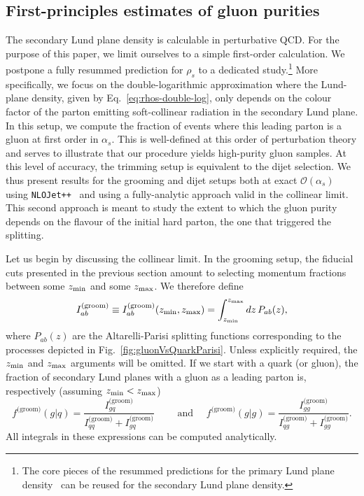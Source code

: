 \documentclass[a4paper,11pt]{article}
\newcommand{\zmin}{z_{\rm{min}}}
\newcommand{\zmax}{z_{\rm{max}}}
\begin{document}
\subsection{First-principles estimates of gluon purities}
\label{sec:analytics}
The secondary Lund plane density is calculable in perturbative QCD. For the purpose of this paper, we limit ourselves to a simple first-order calculation. We postpone a fully resummed prediction for $\rho_s$ to a dedicated study.\footnote{The core pieces of the resummed predictions for the primary Lund plane density~\cite{Lifson:2020gua} can be reused for the secondary Lund plane density.} 
%
More specifically, we focus on the double-logarithmic approximation where the Lund-plane density, given by Eq.~\eqref{eq:rhos-double-log}, only depends on the colour factor of the parton emitting soft-collinear radiation in the secondary Lund plane.
%
In this setup, we compute the fraction of events where this leading parton is a gluon at first order in $\alpha_s$. This is well-defined at this order of perturbation theory and serves to illustrate that our procedure yields high-purity gluon samples. 
%
At this level of accuracy, the trimming setup is equivalent to the dijet selection. We thus present results for the grooming and dijet setups both at exact $\mathcal{O}(\alpha_s)$ using \texttt{NLOJet++}~\cite{Nagy:2003tz} and using a fully-analytic approach valid in the collinear limit. 
%
This second approach is meant to study the extent to which the gluon purity depends on the flavour of the initial hard parton, the one that triggered the splitting.

Let us begin by discussing the collinear limit. In the grooming setup, the fiducial cuts presented in the previous section amount to selecting momentum fractions between some $\zmin$ and some $\zmax$. We therefore define
%
\begin{equation}
\label{eq:int-Pab}
I^\text{(groom)}_{ab} \equiv I^\text{(groom)}_{ab}(\zmin,\zmax) = \int_{\zmin}^{\zmax} dz\, P_{ab}(z),
\end{equation}
%
where $P_{ab}(z)$ are the Altarelli-Parisi splitting functions corresponding to the processes depicted in Fig.~\ref{fig:gluonVsQuarkParisi}. Unless explicitly required, the $\zmin$ and $\zmax$ arguments will be omitted. If we start with a quark (or gluon), the fraction of secondary Lund planes with a gluon as a leading parton is, respectively (assuming $\zmin<\zmax$)
%
\begin{equation}\label{eq:g-frac-collinear-groom}
f^\text{(groom)}(g|q) = \frac{I^\text{(groom)}_{gq}}{I^\text{(groom)}_{qq}+I^\text{(groom)}_{gq}}
\qquad\text{ and }\quad
f^\text{(groom)}(g|g) = \frac{I^\text{(groom)}_{gg}}{I^\text{(groom)}_{qg}+I^\text{(groom)}_{gg}}.
\end{equation}
%
All integrals in these expressions can be computed analytically. 
\end{document}
